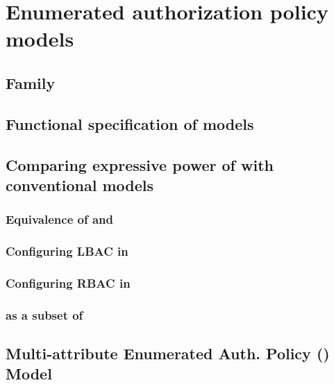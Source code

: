 \chapter{Enumerated authorization policy models}



	

\section{\eapABAC{} Family}
	
\section{Functional specification of \eapABAC{} models}
	
\section{Comparing expressive power of  \eapABAC{} with conventional models}
\subsection{Equivalence of \eapABAC{}  and \twoSortedRBAC{} }
	
\subsection{Configuring LBAC in \eapABAC{}}
	
\subsection{Configuring RBAC in \eapABAC{}}
	
\subsection{\eapABAC{} as a subset of \policyMachine{}}
	
\section{Multi-attribute Enumerated Auth. Policy (\eapmnABAC{}) Model }
	